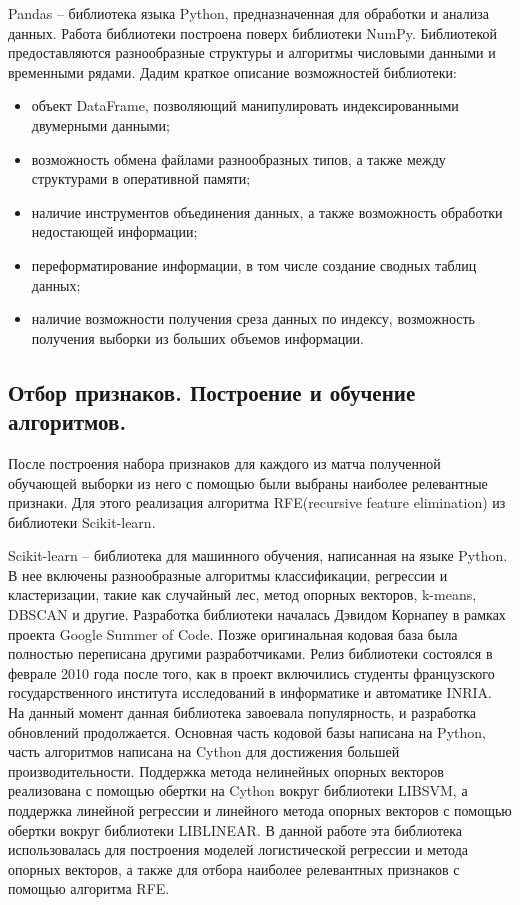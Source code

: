 Pandas – библиотека языка Python, предназначенная для обработки и анализа данных. Работа библиотеки построена поверх библиотеки NumPy. Библиотекой предоставляются разнообразные структуры и алгоритмы числовыми данными и временными рядами. Дадим краткое описание возможностей библиотеки:
\begin{itemize}
	\item
объект DataFrame, позволяющий манипулировать индексированными двумерными данными;
	\item
возможность обмена файлами разнообразных типов, а также между структурами в оперативной памяти;
	\item
наличие инструментов объединения данных, а также возможность обработки недостающей информации;
	\item
переформатирование информации, в том числе создание сводных таблиц данных;
	\item
наличие возможности получения среза данных по индексу, возможность получения выборки из больших объемов информации.\cite{five}
\end{itemize}

\subsection{Отбор признаков. Построение и обучение алгоритмов.}
После построения набора признаков для каждого из матча полученной обучающей выборки из него с помощью были выбраны наиболее релевантные признаки. Для этого реализация алгоритма RFE(recursive feature elimination) из библиотеки Scikit-learn.

Scikit-learn – библиотека для машинного обучения, написанная на языке Python.  В нее включены разнообразные алгоритмы классификации, регрессии и кластеризации, такие как случайный лес, метод опорных векторов, k-means, DBSCAN и другие. Разработка библиотеки началась Дэвидом Корнапеу в рамках проекта Google Summer of Code. Позже оригинальная кодовая база была полностью переписана другими разработчиками. Релиз библиотеки состоялся в феврале 2010 года после того, как в проект включились студенты французского государственного института исследований в информатике и автоматике INRIA. На данный момент данная библиотека завоевала популярность, и разработка обновлений продолжается. Основная часть кодовой базы написана на Python, часть алгоритмов написана на Cython для достижения большей производительности. Поддержка метода нелинейных опорных векторов реализована с помощью обертки на Cython вокруг библиотеки LIBSVM, а поддержка линейной регрессии и линейного метода опорных векторов с помощью обертки вокруг библиотеки LIBLINEAR. В данной работе эта библиотека использовалась для построения моделей логистической регрессии и метода опорных векторов, а также для отбора наиболее релевантных признаков с помощью алгоритма RFE.

